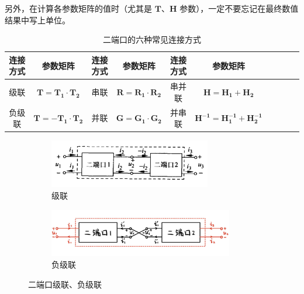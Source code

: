 \documentclass[UTF8]{report}
\theoremstyle{MyLineTheoremStyle} %
\theoremstyle{MyBlockTheoremStyle} %
\theoremstyle{MySubsubsectionStyle} %
\begin{document}
另外，在计算各参数矩阵的值时（尤其是 $\boldsymbol{T}$、$\boldsymbol{H}$ 参数），一定不要忘记在最终数值结果中写上单位。

\begin{table}[H]\centering
    \caption{二端口的六种常见连接方式}
    \label{二端口的六种常见连接方式}
\begin{tabular}{cccccccccc}\toprule
    连接方式 & 参数矩阵 & 连接方式 & 参数矩阵 & 连接方式 & 参数矩阵\\
    \midrule
    级联  &  $\boldsymbol{T} = \boldsymbol{T_1}\cdot \boldsymbol{T_2}$    &   串联 & $\boldsymbol{R} = \boldsymbol{R_1} \cdot \boldsymbol{R_2}$ & 串并联 & $\boldsymbol{H} = \boldsymbol{H_1} + \boldsymbol{H_2}$ \\ 
    负级联 &  $\boldsymbol{T} = -\boldsymbol{T_1}\cdot \boldsymbol{T_2}$  &   并联 & $\boldsymbol{G} = \boldsymbol{G_1}\cdot \boldsymbol{G_2}$ & 并串联 & $\boldsymbol{H^{-1}} = \boldsymbol{H_1^{-1}} + \boldsymbol{H_2^{-1}}$\\ 
    \bottomrule
\end{tabular}
\end{table}

\begin{figure}[H]\centering
\begin{subfigure}[t]{0.42\textwidth}\centering
    \includegraphics[height=60pt]{assets/2/级联.png}
    \caption{ 级联 }
\end{subfigure}\begin{subfigure}[t]{0.58\textwidth}\centering
    \includegraphics[height=60pt]{assets/2/负级联.png}
    \caption{ 负级联 }
\end{subfigure}
\caption{ 二端口级联、负级联}
\end{figure}
\end{document}
